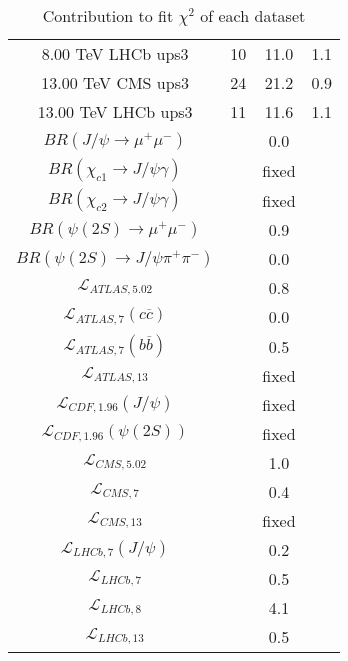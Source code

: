 \begin{table}[h!]
\begin{tabular}{c|c|c|c}
8.00 TeV LHCb ups3 & 10 & 11.0 & 1.1 \\
13.00 TeV CMS ups3 & 24 & 21.2 & 0.9 \\
13.00 TeV LHCb ups3 & 11 & 11.6 & 1.1 \\
\hline
$BR(J/\psi\rightarrow\mu^+\mu^-)$ &  & 0.0 &  \\
$BR(\chi_{c1}\rightarrow J/\psi\gamma)$ &  & fixed & \\
$BR(\chi_{c2}\rightarrow J/\psi\gamma)$ &  & fixed & \\
$BR(\psi(2S)\rightarrow\mu^+\mu^-)$ &  & 0.9 &  \\
$BR(\psi(2S)\rightarrow J/\psi\pi^+\pi^-)$ &  & 0.0 &  \\
$\mathcal L_{ATLAS,5.02}$ &  & 0.8 &  \\
$\mathcal L_{ATLAS,7}(c\overline c)$ &  & 0.0 &  \\
$\mathcal L_{ATLAS,7}(b\overline b)$ &  & 0.5 &  \\
$\mathcal L_{ATLAS,13}$ &  & fixed & \\
$\mathcal L_{CDF,1.96}(J/\psi)$ &  & fixed & \\
$\mathcal L_{CDF,1.96}(\psi(2S))$ &  & fixed & \\
$\mathcal L_{CMS,5.02}$ &  & 1.0 &  \\
$\mathcal L_{CMS,7}$ &  & 0.4 &  \\
$\mathcal L_{CMS,13}$ &  & fixed & \\
$\mathcal L_{LHCb,7}(J/\psi)$ &  & 0.2 &  \\
$\mathcal L_{LHCb,7}$ &  & 0.5 &  \\
$\mathcal L_{LHCb,8}$ &  & 4.1 &  \\
$\mathcal L_{LHCb,13}$ &  & 0.5 &  \\
\end{tabular}
\caption{Contribution to fit $\chi^2$ of each dataset}
\end{table}
